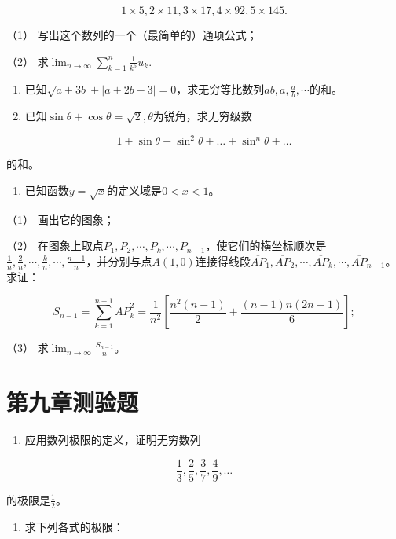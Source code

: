 \[
1 \times 5, 2 \times 11, 3 \times 17, 4 \times 92, 5 \times 145.
\]

（1） 写出这个数列的一个（最简单的）通项公式；

（2） 求\(\lim_{n\to\infty}\sum_{k=1}^{n}\frac{1}{k^{5}}u_{k}.\)

\begin{enumerate}[start=5]
\item
  已知\(\sqrt{a + 3b} + |a + 2b - 3| = 0\)，求无穷等比数列\(ab, a, \frac{a}{b}, \cdots\)的和。
\item
  已知\(\sin \theta + \cos \theta = \sqrt{2}, \theta\)为锐角，求无穷级数
\end{enumerate}

\[
1 + \sin \theta + \sin^{2} \theta + \dots + \sin^{n} \theta + \dots
\]

的和。

\begin{enumerate}[start=7]
\item
  已知函数\(y = \sqrt{x}\)的定义域是\(0 < x < 1\)。
\end{enumerate}

（1） 画出它的图象；

（2）
在图象上取点\(P_{1}, P_{2}, \cdots, P_{k}, \cdots, P_{n-1}\)，使它们的横坐标顺次是\(\frac{1}{n}, \frac{2}{n}, \cdots, \frac{k}{n}, \cdots, \frac{n-1}{n}\)，并分别与点\(A(1,0)\)连接得线段\(\overline{AP}_{1}, \overline{AP}_{2}, \cdots, \overline{AP}_{k}, \cdots, \overline{AP}_{n-1}\)。求证：

\[
S_{n - 1} = \sum_{k = 1}^{n - 1} \overline {{{A P}}}_{k}^{2} = \frac{1}{n^{2}} \left[ \frac{n^{2} (n - 1)}{2} + \frac{(n - 1) n (2 n - 1)}{6} \right];
\]

（3） 求\(\lim_{n\to\infty}\frac{S_{n-1}}{n}\)。

\section{第九章测验题}

\begin{enumerate}
\item
  应用数列极限的定义，证明无穷数列
\end{enumerate}

\[
\frac{1}{3}, \frac{2}{5}, \frac{3}{7}, \frac{4}{9}, \dots
\]

的极限是\(\frac{1}{2}\)。

\begin{enumerate}[start=2]
\item
  求下列各式的极限：
\end{enumerate}

